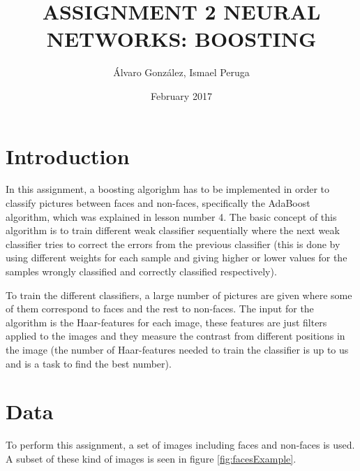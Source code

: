 \documentclass{article}
\title{ASSIGNMENT 2 NEURAL NETWORKS: BOOSTING}
\author{Álvaro González, Ismael Peruga}
\date{February 2017}
\begin{document}
\maketitle
\section{Introduction}
In this assignment, a boosting algorighm has to be implemented in order to classify pictures between faces and non-faces, specifically the AdaBoost algorithm, which was explained in lesson number 4. The basic concept of this algorithm is to train different weak classifier sequentially where the next weak classifier tries to correct the errors from the previous classifier (this is done by using different weights for each sample and giving higher or lower values for the samples wrongly classified and correctly classified respectively).

To train the different classifiers, a large number of pictures are given where some of them correspond to faces and the rest to non-faces. The input for the algorithm is the Haar-features for each image, these features are just filters applied to the images and they measure the contrast from different positions in the image (the number of Haar-features needed to train the classifier is up to us and is a task to find the best number).

\section{Data}
To perform this assignment, a set of images including faces and non-faces is used. A subset of these kind of images is seen in figure \ref{fig:facesExample}.
\end{document}
